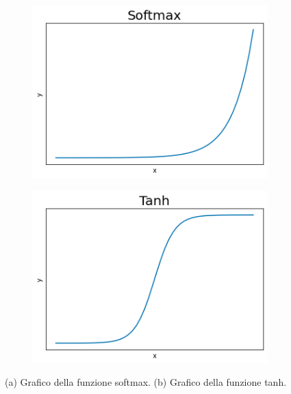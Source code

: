\documentclass[../../main.tex]{subfiles}
\begin{document}
\begin{figure}[H]
    \centering
    \begin{subfigure}[b]{0.49\textwidth}
        \centering
        \includegraphics[width = \textwidth]{immagini/4_2/softmax.png}
        \caption{}
        \label{fig:softmax}
    \end{subfigure}
    \begin{subfigure}[b]{0.49\textwidth}
        \centering
        \includegraphics[width = \textwidth]{immagini/4_2/tanh.png}      
        \caption{}  
        \label{fig:tanh}
    \end{subfigure}
    \caption{(a) Grafico della funzione softmax. (b) Grafico della funzione tanh.}
\end{figure}
\end{document}

